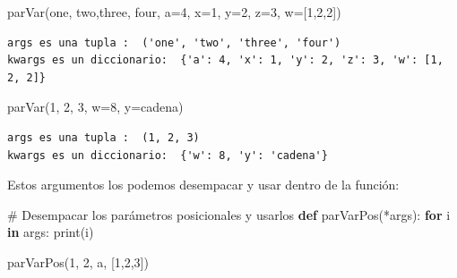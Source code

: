 \documentclass[
  spanish,
  letterpaper,
]{scrbook}
\newenvironment{Shaded}{\begin{snugshade}}{\end{snugshade}}
\newcommand{\BuiltInTok}[1]{\textcolor[rgb]{0.00,0.23,0.31}{#1}}
\newcommand{\CommentTok}[1]{\textcolor[rgb]{0.37,0.37,0.37}{#1}}
\newcommand{\ControlFlowTok}[1]{\textcolor[rgb]{0.00,0.23,0.31}{\textbf{#1}}}
\newcommand{\DecValTok}[1]{\textcolor[rgb]{0.68,0.00,0.00}{#1}}
\newcommand{\KeywordTok}[1]{\textcolor[rgb]{0.00,0.23,0.31}{\textbf{#1}}}
\newcommand{\NormalTok}[1]{\textcolor[rgb]{0.00,0.23,0.31}{#1}}
\newcommand{\OperatorTok}[1]{\textcolor[rgb]{0.37,0.37,0.37}{#1}}
\newcommand{\StringTok}[1]{\textcolor[rgb]{0.13,0.47,0.30}{#1}}
\theoremstyle{definition}
\theoremstyle{remark}
\begin{document}
\begin{Shaded}
\begin{Highlighting}[]
\NormalTok{parVar(}\StringTok{\textquotesingle{}one\textquotesingle{}}\NormalTok{, }\StringTok{\textquotesingle{}two\textquotesingle{}}\NormalTok{,}\StringTok{\textquotesingle{}three\textquotesingle{}}\NormalTok{, }\StringTok{\textquotesingle{}four\textquotesingle{}}\NormalTok{, }
\NormalTok{       a}\OperatorTok{=}\DecValTok{4}\NormalTok{,  x}\OperatorTok{=}\DecValTok{1}\NormalTok{, y}\OperatorTok{=}\DecValTok{2}\NormalTok{, z}\OperatorTok{=}\DecValTok{3}\NormalTok{, w}\OperatorTok{=}\NormalTok{[}\DecValTok{1}\NormalTok{,}\DecValTok{2}\NormalTok{,}\DecValTok{2}\NormalTok{])}
\end{Highlighting}
\end{Shaded}

\begin{verbatim}
args es una tupla :  ('one', 'two', 'three', 'four')
kwargs es un diccionario:  {'a': 4, 'x': 1, 'y': 2, 'z': 3, 'w': [1, 2, 2]}
\end{verbatim}

\begin{Shaded}
\begin{Highlighting}[]
\NormalTok{parVar(}\DecValTok{1}\NormalTok{, }\DecValTok{2}\NormalTok{, }\DecValTok{3}\NormalTok{, w}\OperatorTok{=}\DecValTok{8}\NormalTok{, y}\OperatorTok{=}\StringTok{\textquotesingle{}cadena\textquotesingle{}}\NormalTok{)}
\end{Highlighting}
\end{Shaded}

\begin{verbatim}
args es una tupla :  (1, 2, 3)
kwargs es un diccionario:  {'w': 8, 'y': 'cadena'}
\end{verbatim}

Estos argumentos los podemos desempacar y usar dentro de la función:

\begin{Shaded}
\begin{Highlighting}[]
\CommentTok{\# Desempacar los parámetros posicionales y usarlos}
\KeywordTok{def}\NormalTok{ parVarPos(}\OperatorTok{*}\NormalTok{args):}
    \ControlFlowTok{for}\NormalTok{ i }\KeywordTok{in}\NormalTok{ args:}
        \BuiltInTok{print}\NormalTok{(i)}
\end{Highlighting}
\end{Shaded}

\begin{Shaded}
\begin{Highlighting}[]
\NormalTok{parVarPos(}\DecValTok{1}\NormalTok{, }\DecValTok{2}\NormalTok{, }\StringTok{\textquotesingle{}a\textquotesingle{}}\NormalTok{, [}\DecValTok{1}\NormalTok{,}\DecValTok{2}\NormalTok{,}\DecValTok{3}\NormalTok{])}
\end{Highlighting}
\end{Shaded}
\end{document}

